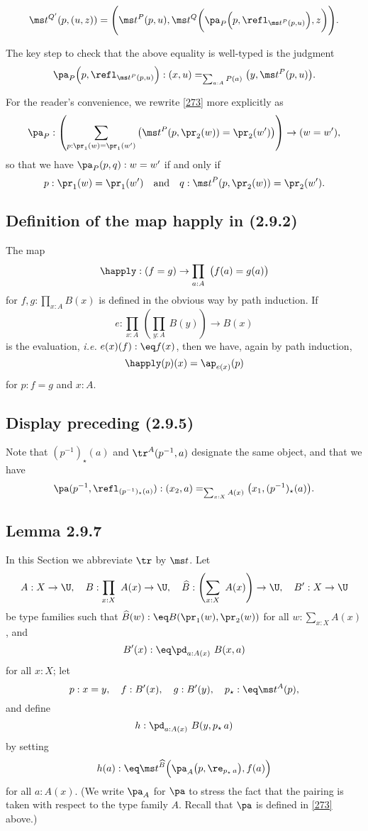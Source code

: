 \documentclass[12pt]{article}
\begin{document}
\begin{equation}\label{ld}
\ms t^{Q'}(p,(u,z))=\Bigg(\ms t^P(p,u),\ms t^Q\bigg(\pa_P\Big(p,\refl_{\ms t^P(p,u)}\Big),z\bigg)\Bigg).
\end{equation}

The key step to check that the above equality is well-typed is the judgment 
$$
\pa_P\Big(p,\refl_{\ms t^P(p,u)}\Big):(x,u)=_{\sum_{a:A}P(a)}\big(y,\ms t^P(p,u)\big).
$$ 

For the reader's convenience, we rewrite \eqref{273} more explicitly as 
$$
\pa_P:\left(\sum_{p:\pr_1(w)=\pr_1(w')}\big(\ms t^P(p,\pr_2(w))=\pr_2(w')\big)\right)\to(w=w'),
$$ 
so that we have $\pa_P(p,q):w=w'$ if and only if 
$$
p:\pr_1(w)=\pr_1(w')\quad\text{and}\quad q:\ms t^P(p,\pr_2(w))=\pr_2(w').
$$


\subsection{Definition of the map \textsf{happly} in (2.9.2)}

The map 
$$
\happly:(f=g)\to\prod_{a:A}\ \big(f(a)=g(a)\big)
$$ 
for $f,g:\prod_{x:A}B(x)$ is defined in the obvious way by path induction. If 
$$
e:\prod_{x:A}\ \left(\prod_{y:A}\ B(y)\right)\to B(x)
$$ 
is the evaluation, \emph{i.e.} $e(x)(f):\eq f(x)$, then we have, again by path induction, 
$$
\happly(p)(x)=\ap_{e(x)}(p)
$$ 
for $p:f=g$ and $x:A$. 


\subsection{Display preceding (2.9.5)}

Note that $(p^{-1})_\star(a)$ and $\tr^A(p^{-1},a)$ designate the same object, and that we have 
$$
\pa(p^{-1},\refl_{(p^{-1})_\star(a)}):(x_2,a)=_{\sum_{x:X}A(x)}\big(x_1,(p^{-1})_\star(a)\big).
$$ 


\subsection{Lemma 2.9.7}

In this Section we abbreviate $\tr$ by $\ms t$. Let 
$$
A:X\to\U,\quad B:\prod_{x:X}\ A(x)\to\U,\quad\widehat B:\left(\sum_{x:X}\ A(x)\right)\to\U,\quad B':X\to\U
$$ 
be type families such that $\widehat B(w):\eq B(\pr_1(w),\pr_2(w))$ for all $w:\sum_{x:X}A(x)$, and 
$$
B'(x):\eq\pd_{a:A(x)}\ B(x,a)
$$ 
for all $x:X$; let 
$$
p:x=y,\quad f:B'(x),\quad g:B'(y),\quad p_\star:\eq\ms t^A(p),
$$ 
and define 
$$
h:\pd_{a:A(x)}\ B(y,p_\star\,a)
$$ 
by setting 
$$
h(a):\eq\ms t^{\widehat B}\Big(\pa_A\big(p,\re_{p_\star\,a}\big),f(a)\Big)
$$ 
for all $a:A(x)$. (We write $\pa_A$ for $\pa$ to stress the fact that the pairing is taken with respect to the type family $A$. Recall that $\pa$ is defined in \eqref{273} above.)
\end{document}
